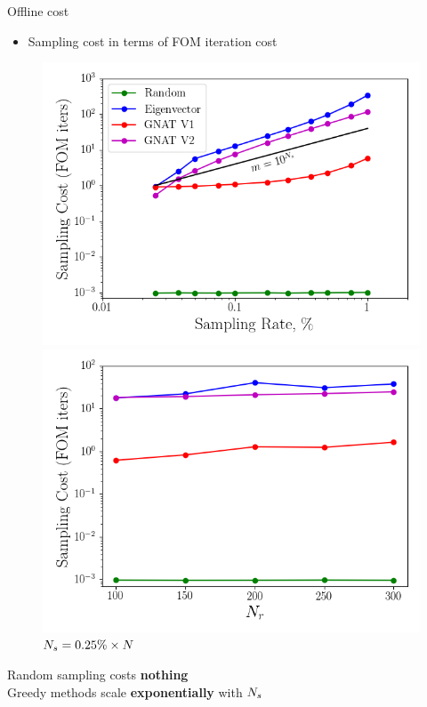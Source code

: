 \documentclass[]{beamer}
\begin{document}
\begin{frame}{Offline cost}
	\begin{itemize}
		\item Sampling cost in terms of FOM iteration cost 
	\end{itemize}
	\begin{figure}
		\begin{minipage}{0.49\linewidth}
			\includegraphics[width=0.99\linewidth]{Images/experiments/cvrc/samp_timing_wrt_samprate.png}
			\caption*{$\numResModes = 300$}
		\end{minipage}
		\begin{minipage}{0.49\linewidth}
			\includegraphics[width=0.99\linewidth]{Images/experiments/cvrc/samp_timing_wrt_modes.png}
			\caption*{$N_s = 0.25\% \times N$}
		\end{minipage}
	\end{figure}
	\begin{tcolorbox}[colframe=blue!50!white,halign=center]
		Random sampling costs \textbf{nothing} \\
		Greedy methods scale \textbf{exponentially} with $N_s$
	\end{tcolorbox}
\end{frame}
\end{document}

